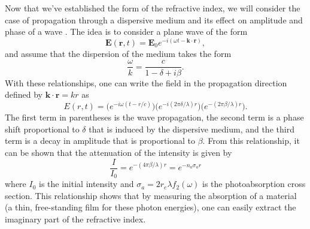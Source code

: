 Now that we've established the form of the refractive index, we will consider the case of propagation through a dispersive medium and its effect on amplitude and phase of a wave \cite{attwoodSoftXraysExtreme2000}. The idea is to consider a plane wave of the form
\begin{equation}
	\mathbf{E}(\mathbf{r},t)=\mathbf{E}_0e^{-i(\omega t - \mathbf{k}\cdot\mathbf{r})},
\end{equation}
and assume that the dispersion of the medium takes the form
\begin{equation}
	\frac{\omega}{k}=\frac{c}{1-\delta+i\beta}.
\end{equation}
With these relationships, one can write the field in the propagation direction defined by $\mathbf{k}\cdot\mathbf{r}=kr$ as
\begin{equation}
\label{eqn:wave_prop}
	E(r,t)=\big(e^{-i\omega(t - r/c)}\big) \big(e^{-i(2\pi\delta/\lambda)r}\big) \big(e^{-(2\pi\beta/\lambda)r}\big).
\end{equation}
The first term in parentheses is the wave propagation, the second term is a phase shift proportional to $\delta$ that is induced by the dispersive medium, and the third term is a decay in amplitude that is proportional to $\beta$.  From this relationship, it can be shown that the attenuation of the intensity is given by 
\begin{equation}
\label{eqn:beer-lambert}
	\frac{I}{I_0}=e^{-(4\pi\beta/\lambda)r}=e^{-n_a \sigma_a r}
\end{equation}
where $I_0$ is the initial intensity and $\sigma_a=2r_e \lambda f_2(\omega)$ is the photoabsorption cross section.  This relationship shows that by measuring the absorption of a material (a thin, free-standing film for these photon energies), one can easily extract the imaginary part of the refractive index.

